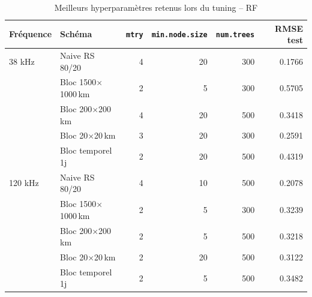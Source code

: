 \begin{table}[htbp]
\centering
\caption{Meilleurs hyperparam\`etres retenus lors du tuning -- RF}
\label{tab:tuning_summary_rf}
\small
\begin{tabularx}{\textwidth}{l l r r r r}
\toprule
Fr\'equence & Sch\'ema & \texttt{mtry} & \texttt{min.node.size} & \texttt{num.trees} & RMSE test \\
\midrule
38 kHz & Naive RS 80/20 &     4 &    20 &   300 & 0.1766 \\
 & Bloc 1500$\times$1000\,km &     2 &     5 &   300 & 0.5705 \\
 & Bloc 200$\times$200\,km &     4 &    20 &   500 & 0.3418 \\
 & Bloc 20$\times$20\,km &     3 &    20 &   300 & 0.2591 \\
 & Bloc temporel 1j &     2 &    20 &   500 & 0.4319 \\
\midrule
120 kHz & Naive RS 80/20 &     4 &    10 &   500 & 0.2078 \\
 & Bloc 1500$\times$1000\,km &     2 &     5 &   300 & 0.3239 \\
 & Bloc 200$\times$200\,km &     2 &     5 &   500 & 0.3218 \\
 & Bloc 20$\times$20\,km &     2 &    20 &   500 & 0.3122 \\
 & Bloc temporel 1j &     2 &     5 &   500 & 0.3482 \\
\bottomrule
\end{tabularx}
\end{table}
